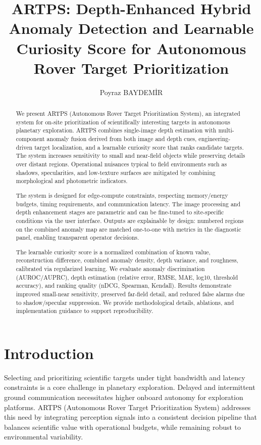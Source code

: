 \documentclass[12pt]{article}
\title{ARTPS: Depth-Enhanced Hybrid Anomaly Detection and Learnable Curiosity Score for Autonomous Rover Target Prioritization}
\author{Poyraz BAYDEM\.{I}R}
\date{}
\begin{document}
\maketitle

\tableofcontents
\newpage

\begin{abstract}
We present ARTPS (Autonomous Rover Target Prioritization System), an integrated system for on-site prioritization of scientifically interesting targets in autonomous planetary exploration. ARTPS combines single-image depth estimation with multi-component anomaly fusion derived from both image and depth cues, engineering-driven target localization, and a learnable curiosity score that ranks candidate targets. The system increases sensitivity to small and near-field objects while preserving details over distant regions. Operational nuisances typical to field environments such as shadows, specularities, and low-texture surfaces are mitigated by combining morphological and photometric indicators.

The system is designed for edge-compute constraints, respecting memory/energy budgets, timing requirements, and communication latency. The image processing and depth enhancement stages are parametric and can be fine-tuned to site-specific conditions via the user interface. Outputs are explainable by design: numbered regions on the combined anomaly map are matched one-to-one with metrics in the diagnostic panel, enabling transparent operator decisions.

The learnable curiosity score is a normalized combination of known value, reconstruction difference, combined anomaly density, depth variance, and roughness, calibrated via regularized learning. We evaluate anomaly discrimination (AUROC/AUPRC), depth estimation (relative error, RMSE, MAE, log10, threshold accuracy), and ranking quality (nDCG, Spearman, Kendall). Results demonstrate improved small-near sensitivity, preserved far-field detail, and reduced false alarms due to shadow/specular suppression. We provide methodological details, ablations, and implementation guidance to support reproducibility.
\end{abstract}

\section{Introduction}
Selecting and prioritizing scientific targets under tight bandwidth and latency constraints is a core challenge in planetary exploration. Delayed and intermittent ground communication necessitates higher onboard autonomy for exploration platforms. ARTPS (Autonomous Rover Target Prioritization System) addresses this need by integrating perception signals into a consistent decision pipeline that balances scientific value with operational budgets, while remaining robust to environmental variability.
\end{document}
